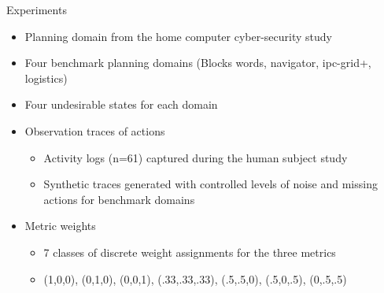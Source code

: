 \begin{frame}{Experiments}
	\begin{itemize}
		\item Planning domain from the home computer cyber-security study
		\item Four benchmark planning domains (Blocks words, navigator, ipc-grid+, logistics)

		\item Four undesirable states for each domain
		\item Observation traces of actions
		\begin{itemize}
			\item Activity logs (n=61) captured during the human subject study
			\item Synthetic traces generated with controlled levels of noise and missing actions for benchmark domains
		\end{itemize}
		\item Metric weights
		\begin{itemize}
			\item 7 classes of discrete weight assignments for the three metrics
			\item (1,0,0), (0,1,0), (0,0,1), (.33,.33,.33), (.5,.5,0), (.5,0,.5), (0,.5,.5)
		\end{itemize}
	\end{itemize}
\end{frame}